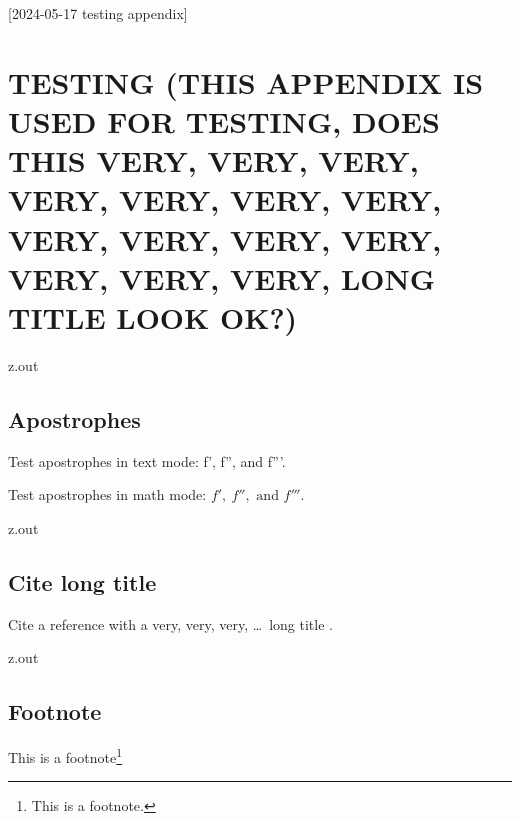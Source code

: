 [2024-05-17 testing appendix]

\chapter{TESTING (THIS APPENDIX IS USED FOR TESTING, DOES THIS
  VERY, VERY, VERY, VERY, VERY, VERY, VERY,
  VERY, VERY, VERY, VERY, VERY, VERY, VERY,
  LONG TITLE LOOK OK?)}


\begin{VerbatimOut}{z.out}


\section{Apostrophes}

Test apostrophes in text mode: f', f'', and f'''.

Test apostrophes in math mode: \(f',\ f'',\text{ and }f'''\).
\end{VerbatimOut}

\MyIO


\begin{VerbatimOut}{z.out}


\section{Cite long title}

Cite a reference with a very, very, very, \ldots\ long title
\cite{test-long-title}.
\end{VerbatimOut}

\MyIO


\begin{VerbatimOut}{z.out}


\section{Footnote}

This is a footnote\footnote{This is a footnote.}%
\index{\verb+\footnote+}%
\end{VerbatimOut}

\MyIO


% 


